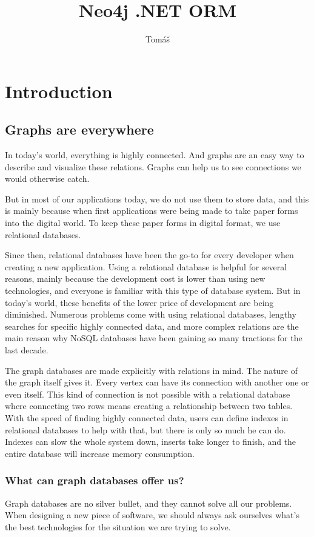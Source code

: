 \documentclass[thesis=M,english]{FITthesis}[2019/12/23]
\title{Neo4j .NET ORM}
\author{Tomáš} %
\begin{document}

\chapter{Introduction}

\section{Graphs are everywhere}
In today's world, everything is highly connected. And graphs are an easy way to describe and visualize these relations. Graphs can help us to see connections we would otherwise catch.

But in most of our applications today, we do not use them to store data, and this is mainly because when first applications were being made to take paper forms into the digital world.
To keep these paper forms in digital format, we use relational databases.

Since then, relational databases have been the go-to for every developer when creating a new application. Using a relational database is helpful for several reasons, mainly because the
development cost is lower than using new technologies, and everyone is familiar with this type of database system. But in today's world, these benefits of the lower price of development
are being diminished. Numerous problems come with using relational databases, lengthy searches for specific highly connected data, and more complex relations are the main reason why NoSQL
databases have been gaining so many tractions for the last decade.

The graph databases are made explicitly with relations in mind. The nature of the graph itself gives it. Every vertex can have its connection with another one or even itself. This kind of connection is not possible with a relational database where connecting two rows means creating a relationship between two tables. With the speed of finding highly connected data, users can define indexes in relational databases to help with that, but there is only so much he can do. Indexes can slow the whole system down, inserts take longer to finish, and the entire database will increase memory consumption.

\subsection{What can graph databases offer us?}
Graph databases are no silver bullet, and they cannot solve all our problems. When designing a new piece of software, we should always ask ourselves what's the best technologies for the situation we are trying to solve.
\end{document}

